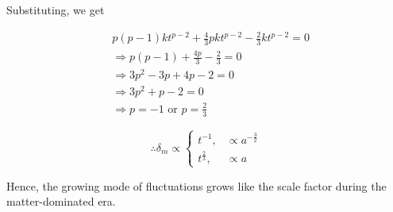 \documentclass[a4,12pt,oneside]{report}
\begin{document}
	Substituting, we get
	
	\begin{align}\label{key}
	&p(p-1)kt^{p-2} + \frac{4}{3}pkt^{p-2} - \frac{2}{3}kt^{p-2} = 0 \nonumber
	\\
	&\Rightarrow p(p-1)+\frac{4p}{3} - \frac{2}{3} = 0 \nonumber
	\\
	&\Rightarrow 3p^2 - 3p + 4p -2 =0 \nonumber
	\\
	&\Rightarrow 3p^2+p-2 = 0 \nonumber
	\\
	&\Rightarrow p=-1 \text{ or } p=\frac{2}{3} \nonumber
	\end{align}
	
	\begin{equation}\label{key}
	\therefore \delta_m \propto \begin{cases}t^{-1}, &\propto a^{-\frac{3}{2}}\\
	t^{\frac{2}{3}}, &\propto a
	\end{cases}
	\end{equation}
	
	Hence, the growing mode of fluctuations grows like the scale factor during the matter-dominated era.
\end{document}
